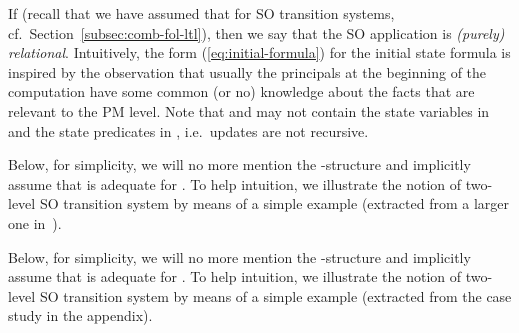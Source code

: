 \documentclass[conference]{IEEEtran}
\newcommand{\secref}[1]{Section~\ref{#1}}
\begin{document}
If  (recall that we have assumed that
 for SO transition systems,
cf.~\secref{subsec:comb-fol-ltl}), then we say that the SO application
is \emph{(purely) relational}.  Intuitively, the form
(\ref{eq:initial-formula}) for the initial state formula is inspired by
the observation that usually the principals at the beginning of the
computation have some common (or no) knowledge about the facts that
are relevant to the PM level.  Note that  and
 may not contain the state variables in
 and the state predicates in , i.e.\
updates are not recursive.  

\begin{SHORT}
Below, for simplicity, we will no more mention the
-structure  and implicitly assume
that  is adequate for .  To help
intuition, we illustrate the notion of two-level SO transition system
by means of a simple example (extracted from a larger one
in~\cite{BRV-TR09}).
\end{SHORT}
\begin{LONG}
Below, for simplicity, we will no more mention the
-structure  and implicitly assume
that  is adequate for .  To help
intuition, we illustrate the notion of two-level SO transition system
by means of a simple example (extracted from the case study in the appendix).
\end{LONG}
\end{document}
